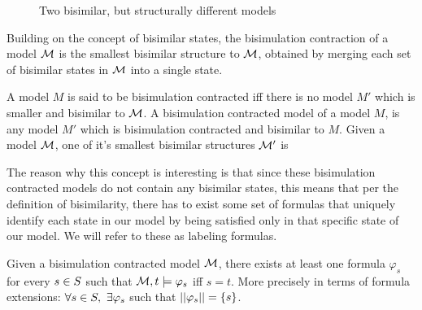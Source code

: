 \begin{figure}[h]
	\label{fig:bisimmods}
	\caption{Two bisimilar, but structurally different models}
	\centering
\end{figure}

Building on the concept of bisimilar states, the bisimulation contraction of a model $\mathcal{M}$ is the smallest bisimilar structure to $\mathcal{M}$, obtained by merging each set of bisimilar states in $\mathcal{M}$ into a single state. 

\begin{definition}
	\label{def:bisimContract}
	A model $M$ is said to be bisimulation contracted iff there is no model $M'$ which is smaller and bisimilar to $\mathcal{M}$. A bisimulation contracted model of a model $M$, is any model $M'$ which is bisimulation contracted and bisimilar to $M$.
	Given a model $\mathcal{M}$, one of it's smallest bisimilar structures $\mathcal{M}'$ is 
\end{definition}

The reason why this concept is interesting is that since these bisimulation contracted models do not contain any bisimilar states, this means that per the definition of bisimilarity, there has to exist some set of formulas that uniquely identify each state in our model by being satisfied only in that specific state of our model. We will refer to these as labeling formulas.

\begin{definition}
	\label{def:label}
	Given a bisimulation contracted model $\mathcal{M}$, there exists at least one formula $\varphi_s$ for every $s\in S$ such that $\mathcal{M},t \models \varphi_s$ iff $s = t$. More precisely in terms of formula extensions: 
	\centering
	$\forall s\in S,~\exists\varphi_s$ such that $||\varphi_s|| = \{s\}$.
\end{definition}

